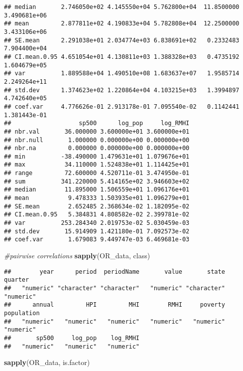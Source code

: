 \documentclass[
]{article}
\newenvironment{Shaded}{\begin{snugshade}}{\end{snugshade}}
\newcommand{\CommentTok}[1]{\textcolor[rgb]{0.56,0.35,0.01}{\textit{#1}}}
\newcommand{\KeywordTok}[1]{\textcolor[rgb]{0.13,0.29,0.53}{\textbf{#1}}}
\newcommand{\NormalTok}[1]{#1}
\begin{document}
\begin{verbatim}
## median       2.746050e+02 4.145550e+04 5.762800e+04  11.8500000 3.490681e+06
## mean         2.877811e+02 4.190833e+04 5.782808e+04  12.2500000 3.433106e+06
## SE.mean      2.291038e+01 2.034774e+03 6.838691e+02   0.2332483 7.904400e+04
## CI.mean.0.95 4.651054e+01 4.130811e+03 1.388328e+03   0.4735192 1.604679e+05
## var          1.889588e+04 1.490510e+08 1.683637e+07   1.9585714 2.249264e+11
## std.dev      1.374623e+02 1.220864e+04 4.103215e+03   1.3994897 4.742640e+05
## coef.var     4.776626e-01 2.913178e-01 7.095540e-02   0.1142441 1.381443e-01
##                   sp500      log_pop     log_RMHI
## nbr.val       36.000000 3.600000e+01 3.600000e+01
## nbr.null       1.000000 0.000000e+00 0.000000e+00
## nbr.na         0.000000 0.000000e+00 0.000000e+00
## min          -38.490000 1.479631e+01 1.079676e+01
## max           34.110000 1.524838e+01 1.114425e+01
## range         72.600000 4.520711e-01 3.474950e-01
## sum          341.220000 5.414165e+02 3.946603e+02
## median        11.895000 1.506559e+01 1.096176e+01
## mean           9.478333 1.503935e+01 1.096279e+01
## SE.mean        2.652485 2.368634e-02 1.182095e-02
## CI.mean.0.95   5.384831 4.808582e-02 2.399781e-02
## var          253.284340 2.019753e-02 5.030459e-03
## std.dev       15.914909 1.421180e-01 7.092573e-02
## coef.var       1.679083 9.449747e-03 6.469681e-03
\end{verbatim}

\begin{Shaded}
\begin{Highlighting}[]
\CommentTok{#pairwise correlations}
\KeywordTok{sapply}\NormalTok{(OR_data, class)}
\end{Highlighting}
\end{Shaded}

\begin{verbatim}
##        year      period  periodName       value       state     quarter 
##   "numeric" "character" "character"   "numeric" "character"   "numeric" 
##      annual         HPI         MHI        RMHI     poverty  population 
##   "numeric"   "numeric"   "numeric"   "numeric"   "numeric"   "numeric" 
##       sp500     log_pop    log_RMHI 
##   "numeric"   "numeric"   "numeric"
\end{verbatim}

\begin{Shaded}
\begin{Highlighting}[]
\KeywordTok{sapply}\NormalTok{(OR_data, is.factor)}
\end{Highlighting}
\end{Shaded}
\end{document}
